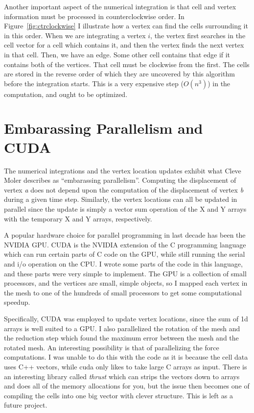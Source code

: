 Another important aspect of the numerical integration is that cell and vertex information must be processed in counterclockwise order. In Figure~\ref{fig:ctrclockwise} I illustrate how a vertex can find the cells surrounding it in this order. When we are integrating a vertex $i$, the vertex first searches in the cell vector for a cell which contains it, and then the vertex finds the next vertex in that cell. Then, we have an edge. Some other cell contains that edge if it contains both of the vertices. That cell must be clockwise from the first. The cells are stored in the reverse order of which they are uncovered by this algorithm before the integration starts. This is a very expensive step ($O(n^3)$) in the computation, and ought to be optimized.


\section{Embarassing Parallelism and CUDA}
The numerical integrations and the vertex location updates exhibit what Cleve Moler describes as ``embarassing parallelism''. Computing the displacement of vertex \emph{a} does not depend upon the computation of the displacement of vertex \emph{b} during a given time step. Similarly, the vertex locations can all be updated in parallel since the update is simply a vector sum operation of the X and Y arrays with the temporary X and Y arrays, respectively. 

A popular hardware choice for parallel programming in last decade has been the NVIDIA GPU. CUDA is the NVIDIA extension of the C programming language which can run certain parts of C code on the GPU, while still running the serial and i/o operation on the CPU. I wrote some parts of the code in this language, and these parts were very simple to implement. The GPU is a collection of small processors, and the vertices are small, simple objects, so I mapped each vertex in the mesh to one of the hundreds of small processors to get some computational speedup.

Specifically, CUDA was employed to update vertex locations, since the sum of 1d arrays is well suited to a GPU. I also parallelized the rotation of the mesh and the reduction step which found the maximum error between the mesh and the rotated mesh. An interesting possibility is that of parallelizing the force computations. I was unable to do this with the code as it is because the cell data uses C++ vectors, while cuda only likes to take large C arrays as input. There is an interesting library called \emph{thrust} which can strips the vectors down to arrays and does all of the memory allocations for you, but the issue then becomes one of compiling the cells into one big vector with clever structure. This is left as a future project. 

